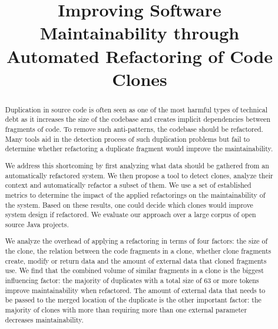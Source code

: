 \documentclass[sigconf,review, table]{acmart}
\begin{document}
\title{Improving Software Maintainability through Automated Refactoring of Code Clones}



\begin{abstract}
Duplication in source code is often seen as one of the most harmful types of technical debt as it increases the size of the codebase and creates implicit dependencies between fragments of code. To remove such anti-patterns, the codebase should be refactored. Many tools aid in the detection process of such duplication problems but fail to determine whether refactoring a duplicate fragment would improve the maintainability.

We address this shortcoming by first analyzing what data should be gathered from an automatically refactored system. We then propose a tool to detect clones, analyze their context and automatically refactor a subset of them. We use a set of established metrics to determine the impact of the applied refactorings on the maintainability of the system. Based on these results, one could decide which clones would improve system design if refactored. We evaluate our approach over a large corpus of open source Java projects.

We analyze the overhead of applying a refactoring in terms of four factors: the size of the clone, the relation between the code fragments in a clone, whether clone fragments create, modify or return data and the amount of external data that cloned fragments use. We find that the combined volume of similar fragments in a clone is the biggest influencing factor: the majority of duplicates with a total size of 63 or more tokens improve maintainability when refactored. The amount of external data that needs to be passed to the merged location of the duplicate is the other important factor: the majority of clones with more than requiring more than one external parameter decreases maintainability.
\end{abstract}


\maketitle
\end{document}
